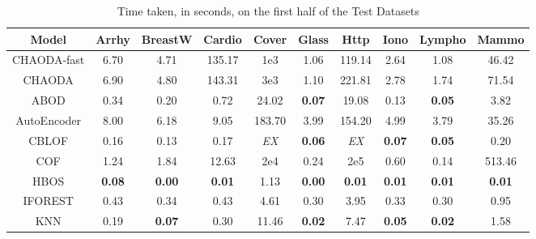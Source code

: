 \documentclass{article}
\begin{document}
\begin{table}[!t]
\renewcommand{\arraystretch}{1.15}
\caption{Time taken, in seconds, on the first half of the Test Datasets}
\label{supplement:table:results:test-time-1}
\vskip 0.15in
\begin{center}
\begin{small}
\begin{tabular}{|c|c|c|c|c|c|c|c|c|c|}
\hline
\textbf{Model} & \textbf{Arrhy} & \textbf{BreastW} & \textbf{Cardio} & \textbf{Cover} & \textbf{Glass} & \textbf{Http} & \textbf{Iono} & \textbf{Lympho} & \textbf{Mammo} \\
\hline
CHAODA-fast &                6.70 &             4.71 &          135.17 &        1e3 &           1.06 &        119.14 &                2.64 &            1.08 &          46.42 \\
\hline
CHAODA &                6.90 &             4.80 &          143.31 &        3e3 &           1.10 &        221.81 &                2.78 &            1.74 &          71.54 \\
\hline
ABOD &                0.34 &             0.20 &            0.72 &          24.02 &  \textbf{0.07} &         19.08 &                0.13 &   \textbf{0.05} &           3.82 \\
\hline
AutoEncoder &                8.00 &             6.18 &            9.05 &         183.70 &           3.99 &        154.20 &                4.99 &            3.79 &          35.26 \\
\hline
CBLOF &                0.16 &             0.13 &            0.17 &    \textit{EX} &  \textbf{0.06} &   \textit{EX} &       \textbf{0.07} &   \textbf{0.05} &           0.20 \\
\hline
COF &                1.24 &             1.84 &           12.63 &       2e4 &           0.24 &      2e5 &                0.60 &            0.14 &         513.46 \\
\hline
HBOS &       \textbf{0.08} &    \textbf{0.00} &   \textbf{0.01} &           1.13 &  \textbf{0.00} & \textbf{0.01} &       \textbf{0.01} &   \textbf{0.01} &  \textbf{0.01} \\
\hline
IFOREST &                0.43 &             0.34 &            0.43 &           4.61 &           0.30 &          3.95 &                0.33 &            0.30 &           0.95 \\
\hline
KNN &                0.19 &    \textbf{0.07} &            0.30 &          11.46 &  \textbf{0.02} &          7.47 &       \textbf{0.05} &   \textbf{0.02} &           1.58 \\

\end{tabular}
\end{small}
\end{center}
\end{table}
\end{document}
